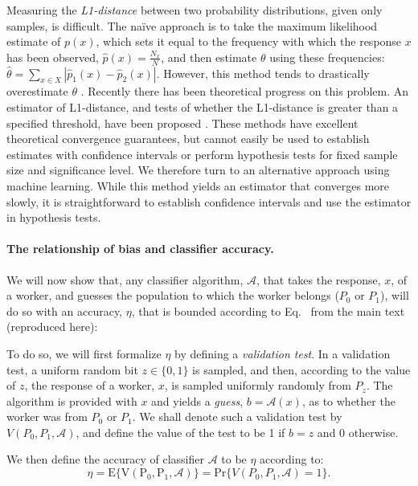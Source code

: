 \documentclass{sigchi}
\begin{document}
Measuring the \textit{L1-distance} between two probability distributions,
given only samples, is difficult.  The na\"ive approach is to take
the maximum likelihood estimate of $p(x)$, which sets it equal to the 
frequency with which the response $x$ has been observed, 
$\hat{p}(x) = \frac{N_x}{N}$, and then estimate $\theta$ 
using these frequencies\cite{batu2013testing}: 
$\hat{\theta} = \sum_{x \in X}|\hat{p}_1(x) - \hat{p}_2(x)|$.  
However, this method tends to drastically overestimate $\theta$
\cite{val-thesis}.
Recently there has been theoretical progress on this problem.
An estimator of L1-distance, and tests of whether the L1-distance is
greater than a specified threshold, have been proposed 
\cite{val-thesis,batu2013testing,chan2014optimal}.  
These methods have excellent theoretical convergence guarantees, but
cannot easily be used to establish estimates with confidence intervals or 
perform hypothesis tests for fixed sample size and significance level.  
We therefore turn to an alternative approach using machine learning. 
While this method yields an estimator that converges more slowly,
it is straightforward to establish confidence intervals and 
use the estimator in hypothesis tests.

\paragraph{The relationship of bias and classifier accuracy.}
We will now show that, any classifier algorithm, $\mathcal{A}$, that
takes the response, $x$, of a worker, and guesses the population to which
the worker belongs ($P_0$ or $P_1$), will do so with an accuracy, $\eta$,
that is bounded according to Eq.~ from the main text 
(reproduced here):

To do so, we will first formalize $\eta$ by defining a 
\textit{validation test}.  In a validation test, a uniform random bit 
$z\in\{0,1\}$ is sampled, and then, according to the value of $z$, the
response of a worker, $x$, is sampled uniformly randomly from $P_z$.  
The algorithm is provided
with $x$ and yields a \textit{guess}, $b=\mathcal{A}(x)$, as to whether the 
worker was 
from $P_0$ or $P_1$.  We shall denote such a validation test by 
$V(P_0, P_1, \mathcal{A})$, and define the value of the test to be 1 if 
$b=z$ and 0 otherwise.  

We then define the accuracy of classifier $\mathcal{A}$ to be $\eta$ according
to:
\begin{equation}
\eta = \mathrm{E\{V(P_0, P_1, \mathcal{A})\}} 
	= \mathrm{Pr}\{V(P_0, P_1, \mathcal{A})=1\}.
\end{equation}
\end{document}

